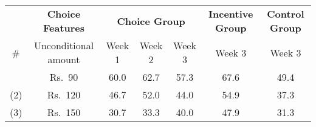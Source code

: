 \begin{tabular}{c c c c c c c}\toprule& \textbf{Choice Features} &  \multicolumn{3}{c}{\textbf{Choice Group}} &\textbf{Incentive Group} & \textbf{Control Group} \\\cmidrule(r){2-2} \cmidrule(r){3-5}  \cmidrule(r){6-6}  \cmidrule(r){7-7}\# & Unconditional amount & Week 1 & Week 2 & Week 3 & Week 3 & Week 3 \\ \midrule (1) & Rs.\ 90  &    60.0&   62.7&   57.3&   67.6&   49.4\\(2) & Rs.\ 120 &    46.7&   52.0&   44.0&   54.9&   37.3\\(3) & Rs.\ 150 &    30.7&   33.3&   40.0&   47.9&   31.3\\\bottomrule\end{tabular}